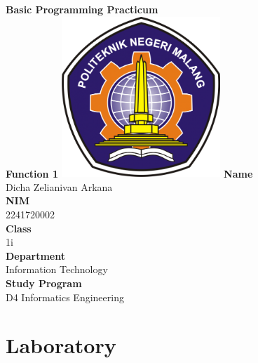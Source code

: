 \documentclass[12pt,titlepage]{article}
\newcommand{\vSubject}{Basic Programming Practicum}
\newcommand{\vSubtitle}{Function 1}
\newcommand{\vName}{Dicha Zelianivan Arkana}
\newcommand{\vNIM}{2241720002}
\newcommand{\vClass}{1i}
\newcommand{\vDepartment}{Information Technology}
\newcommand{\vStudyProgram}{D4 Informatics Engineering}
\begin{document}
\begin{titlepage}
    \centering
    \vfill
    {\bfseries\LARGE
        \vSubject\\
        \vskip0.25cm
        \vSubtitle
    }
    \vfill
    \includegraphics[width=6cm]{images/polinema-logo.png}
    \vfill
    {
        \textbf{Name}\\
        \vName\\
        \vskip0.5cm
        \textbf{NIM}\\
        \vNIM\\
        \vskip0.5cm
        \textbf{Class}\\
        \vClass\\
        \vskip0.5cm
        \textbf{Department}\\
        \vDepartment\\
        \vskip0.5cm
        \textbf{Study Program}\\
        \vStudyProgram
    }
\end{titlepage}

\tableofcontents

\pagebreak

\section{Laboratory}
\end{document}
